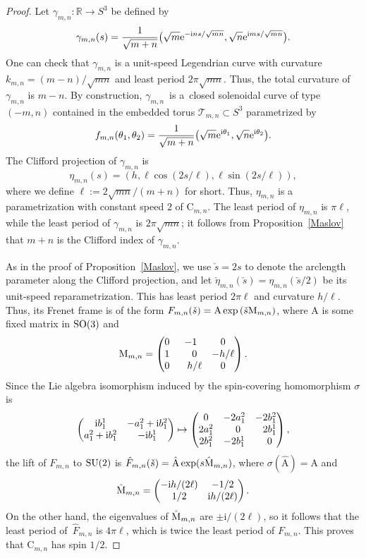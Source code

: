 \documentclass[10pt,a4paper]{amsart}
\newcommand\kk{k} %
\def\ri{\mathrm{i}}
\newcommand{\sdown}{\check{s}} %
\def\gam{\gamma} %
\def\R{\mathbb R}
\newcommand\rA{\mathrm{A}}
\newcommand\rC{\mathrm{C}}
\numberwithin{equation}{section}
\begin{document}
\begin{proof} Let $\gam_{m,n}\colon\R\to S^3$ be defined by
\begin{equation}\label{gammn}\gam_{m,n}(s)=\frac{1}{\sqrt{m+n}}\bigl(\sqrt{m}{\rm e}^{-\ri ns/{\sqrt{mn}}}, \sqrt{n}{\rm e}^{\ri ms/{\sqrt{mn}}}\bigr).
\end{equation}
One can check that $\gam_{m,n}$ is a unit-speed Legendrian curve with curvature $\kk_{m,n}=(m-n)/\sqrt{mn}$ and least period $2\pi\sqrt{mn}$. Thus, the total curvature of $\gam_{m,n}$ is $m-n$. By construction, $\gam_{m,n}$~is a~closed solenoidal curve of type $(-m,n)$ contained in the embedded torus ${\mathcal T}_{m,n}\subset S^3$ parametrized by
\[f_{m,n}(\theta_1,\theta_2)=\frac{1}{\sqrt{m+n}}\bigl( \sqrt{m}{\rm e}^{\ri \theta_1}, \sqrt{n}{\rm e}^{\ri \theta_2}\bigr).
\]
The Clifford projection of $\gam_{m,n}$ is
\[\eta_{m,n}(s)=(h, \ell \cos(2s/\ell),\ell \sin(2s/\ell)),
\]
where we define $\ell:=2\sqrt{mn}/(m+n)$ for short.
Thus, $\eta_{m,n}$ is a parametrization with constant speed $2$ of $\rC_{m,n}$. The least period of $\eta_{m,n}$ is $\pi\ell$, while the least period of $\gam_{m,n}$ is $2\pi\sqrt{mn}$; it follows from Proposition~\ref{Maslov} that $m+n$ is the Clifford index of $\gam_{m,n}$.

As in the proof of Proposition~\ref{Maslov},
we use $\sdown = 2s$ to denote the arclength parameter along the Clifford projection, and let $\check{\eta}_{m,n}(\sdown)=\eta_{m,n}(\sdown/2)$ be its unit-speed reparametrization.
This has least period $2\pi \ell$ and curvature $h/\ell$. Thus, its Frenet frame is of the form
$F_{m,n}(\sdown)=\rA \exp \left(\sdown {\rm M}_{m,n}\right)$,
where $\rA$ is some fixed matrix in ${\rm SO}(3)$ and
\[{\rm M}_{m,n}=\begin{pmatrix} 0&-1&0\\1&\hphantom{-} 0&-h/\ell \\0&\hphantom{-}h/\ell &0\end{pmatrix}.\]
Since the Lie algebra isomorphism induced by the spin-covering homomorphism $\sigma$ is
\[ \begin{pmatrix} \ri b^1_1&-a^2_1+\ri b^2_1\\ a^2_1+\ri b^2_1&-\ri b^1_1 \end{pmatrix} \mapsto
\begin{pmatrix} 0 & -2a^2_1 & -2b^2_1\\ 2a^2_1 & \hphantom{-}0 & \hphantom{-} 2b^1_1\\ 2b^2_1 &-2 b^1_1&\hphantom{-}0 \end{pmatrix},
\]
the lift of $F_{m,n}$ to ${\rm SU}(2)$ is $\hat{F}_{m,n}(\sdown) = \hat{{\rA}} \exp(s\hat{{\rm M}}_{m,n})$, where $\sigma(\hat{\rA}) = \rA$ and
\[\hat{{\rm M}}_{m,n}=\begin{pmatrix} -\ri h/(2\ell) & -1/2 \\ 1/2 &\ri h/(2\ell) \end{pmatrix}.
\]
On the other hand, the eigenvalues of $\hat{\rm M}_{m,n}$ are $\pm \ri/(2\ell)$, so it follows that the least period of~$\hat{F}_{m,n}$ is $4\pi\ell$, which is twice the least period of $F_{m,n}$. This proves that $\rC_{m,n}$ has spin $1/2$.
\end{proof}
\end{document}
